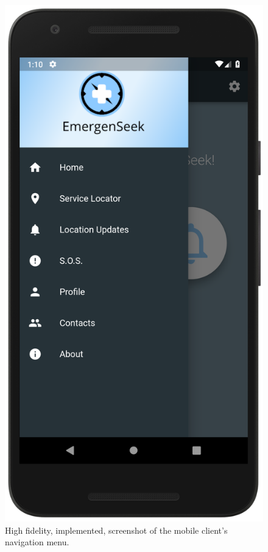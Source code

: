 \documentclass[10pt, a4paper]{article}
\begin{document}
\begin{figure}[H]
\endminipage\hfill
{}
  \includegraphics[width=\linewidth]{demo_navmenu.png}
  \caption{High fidelity, implemented, screenshot of the mobile client's navigation menu.}\label{fig:mobile2}
\endminipage\hfill
{}%

\end{figure}
\end{document}

